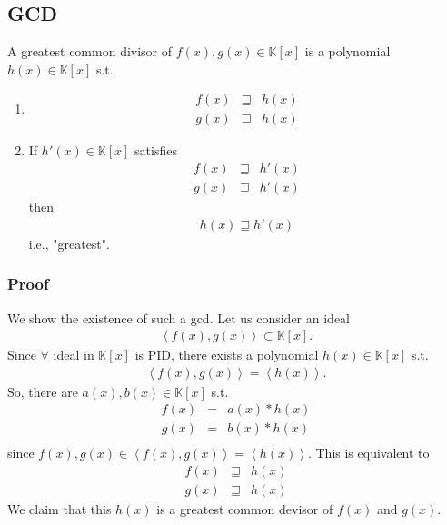 \documentclass[11pt]{book}
\begin{document}
\subsection{GCD}
A greatest common divisor of $f(x),g(x) \in \mathbb{K}[x]$ is a polynomial $h(x) \in \mathbb{K}[x]$ s.t.
\begin{enumerate}
\item 
\begin{eqnarray}
f(x) &\sqsupseteq& h(x) \\
g(x) &\sqsupseteq& h(x) 
\end{eqnarray}

\item If $h'(x) \in \mathbb{K}[x]$ satisfies
\begin{eqnarray}
f(x) &\sqsupseteq& h'(x) \\
g(x) &\sqsupseteq& h'(x) 
\end{eqnarray}
then
\begin{eqnarray}
h(x) \sqsupseteq h'(x) 
\end{eqnarray}
i.e., "greatest".

\end{enumerate}

\subsubsection{Proof}
We show the existence of such a gcd.
Let us consider an ideal
\begin{eqnarray}
\left< f(x), g(x) \right> \subset \mathbb{K}[x].
\end{eqnarray}
Since $\forall$ ideal in $\mathbb{K}[x]$ is PID, there exists a polynomial $h(x) \in \mathbb{K}[x]$ s.t.
\begin{eqnarray}
\left< f(x), g(x) \right> = \left< h(x)\right>.
\end{eqnarray}
So, there are $a(x),b(x) \in \mathbb{K}[x]$ s.t.
\begin{eqnarray}
f(x) &=& a(x) * h(x) \\
g(x) &=& b(x) * h(x) \\
\end{eqnarray}
since $f(x), g(x) \in \left< f(x), g(x) \right> = \left< h(x)\right>$.
This is equivalent to
\begin{eqnarray}
f(x) &\sqsupseteq& h(x) \\
g(x) &\sqsupseteq& h(x) 
\end{eqnarray}
We claim that this $h(x)$ is a greatest common devisor of $f(x)$ and $g(x)$.
\end{document}
